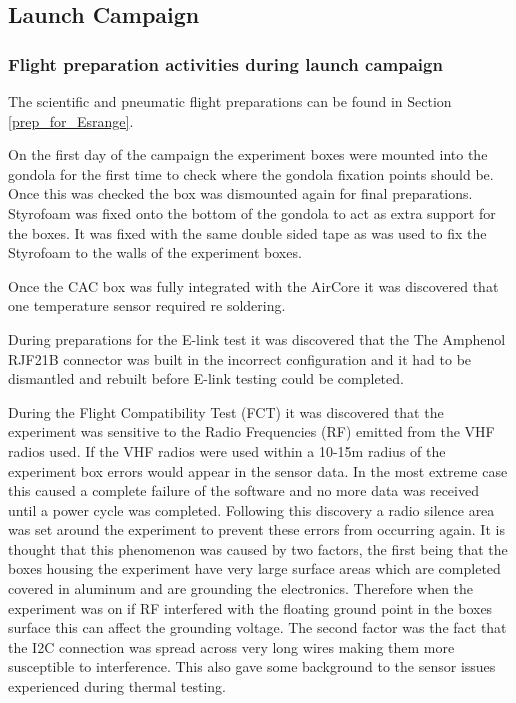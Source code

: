 \pagebreak
\subsection{Launch Campaign}
\subsubsection{Flight preparation activities during launch campaign} %
The scientific and pneumatic flight preparations can be found in Section \ref{prep_for_Esrange}.

On the first day of the campaign the experiment boxes were mounted into the gondola for the first time to check where the gondola fixation points should be. Once this was checked the box was dismounted again for final preparations. Styrofoam was fixed onto the bottom of the gondola to act as extra support for the boxes. It was fixed with the same double sided tape as was used to fix the Styrofoam to the walls of the experiment boxes.

Once the CAC box was fully integrated with the AirCore it was discovered that one temperature sensor required re soldering. 

During preparations for the E-link test it was discovered that the The Amphenol RJF21B connector was built in the incorrect configuration and it had to be dismantled and rebuilt before E-link testing could be completed.

During the Flight Compatibility Test (FCT) it was discovered that the experiment was sensitive to the Radio Frequencies (RF) emitted from the VHF radios used. If the VHF radios were used within a 10-15m radius of the experiment box errors would appear in the sensor data. In the most extreme case this caused a complete failure of the software and no more data was received until a power cycle was completed. Following this discovery a radio silence area was set around the experiment to prevent these errors from occurring again. It is thought that this phenomenon was caused by two factors, the first being that the boxes housing the experiment have very large surface areas which are completed covered in aluminum and are grounding the electronics. Therefore when the experiment was on if RF interfered with the floating ground point in the boxes surface this can affect the grounding voltage. The second factor was the fact that the I2C connection was spread across very long wires making them more susceptible to interference. This also gave some background to the sensor issues experienced during thermal testing.

